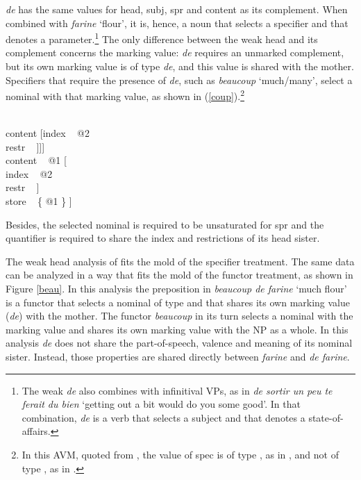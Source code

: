 \documentclass[output=paper]{langsci/langscibook}
\begin{document}
\noindent
\emph{de} has the same values for {\sc head}, {\sc subj}, {\sc spr} and 
{\sc content} as its complement. 
When combined with \emph{farine} `flour', it is, hence, a noun 
that selects a specifier and that denotes a parameter.\footnote{The 
weak \emph{de} also combines with infinitival VPs, as in \emph{de sortir un peu
te ferait du bien} `getting out a bit would do you some good'. In that 
combination, \emph{de} is a verb that selects a subject and that denotes 
a state-of-affairs.} The only difference between the weak head and its complement  
concerns the {\sc marking} value: \emph{de} requires an unmarked complement, but 
its own {\sc marking} value is of type \emph{de}, and this value is shared with the mother.  
Specifiers that require the presence of \emph{de}, such as \emph{beaucoup} `much/many', 
select a nominal with that {\sc marking} value, 
as shown in (\ref{coup}).\footnote{In this AVM, quoted from \citet[18]{Abeilleetal04}, 
the value of {\sc spec} is of type , as in \citet{ps2}, and not of type 
, as in \citet{GS00}.}  

\begin{exe} 
\ex\label{coup} 
\begin{avm} 
[cat|head [\type{adverb}                                   \\
           spec|loc [cat [head ~ \type{noun}               \\
                          spr ~ <X>                         \\
                          mark ~ \type{de}]                \\
                     content [index ~ @2                    \\
                              restr ~ \avmbox{$\Sigma$} ]]] \\ 
 content ~ @1 [        \\
               index ~ @2                  \\
               restr ~ \avmbox{$\Sigma$} ] \\
 store ~ \{ @1 \} ]
\end{avm}
\end{exe} 

\noindent
Besides, the selected nominal is required to be unsaturated for {\sc spr} and 
the quantifier is required to share the index and restrictions of its head sister. 

The weak head analysis of \citet{Abeilleetal04} fits the mold of the specifier treatment. 
The same data can be analyzed in a way that fits the mold of the functor treatment,
as shown in Figure \ref{beau}. 
In this analysis the preposition in \emph{beaucoup de farine} `much flour'
is a functor that selects a nominal of type  and that 
shares its own {\sc marking} value (\emph{de}) with the mother. 
The functor \emph{beaucoup} in its turn selects a nominal with the {\sc marking} value 
 and shares its own {\sc marking} value with the NP as a whole. 
In this analysis \emph{de} does not share the part-of-speech, valence and 
meaning of its nominal sister. Instead, those properties are shared directly between
\emph{farine} and \emph{de farine}. 
\end{document}
